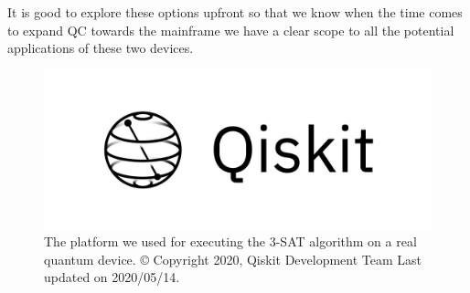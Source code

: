 It is good to explore these options upfront so that we know when the time comes to expand QC towards the mainframe we have a clear scope to all the potential applications of these two devices.


\begin{figure}[h]
	\centering
	\includegraphics[scale = 0.75]{../Demonstration/img/qiskit_logo.PNG}
	\caption{The platform we used for executing the 3-SAT algorithm on a real quantum device. © Copyright 2020, Qiskit Development Team Last updated on 2020/05/14.}
\end{figure}


